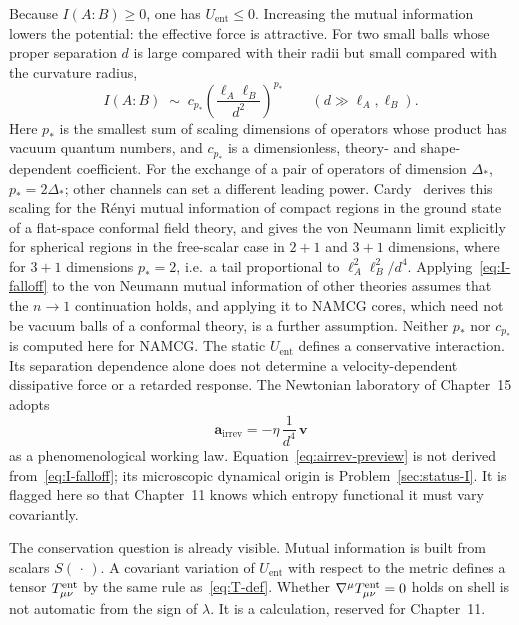 Because \(I(A:B)\ge 0\), one has \(U_{\mathrm{ent}}\le 0\). Increasing
the mutual information lowers the potential: the effective force is
attractive. For two small balls whose proper separation \(d\) is
large compared with their radii but small compared with the curvature
radius,
\begin{equation}
  \label{eq:I-falloff}
  I(A:B)
  \;\sim\;
  c_{p_*}
  \left(\frac{\ell_A\ell_B}{d^2}\right)^{p_*}
  \qquad
  (d\gg \ell_A,\ell_B).
\end{equation}
Here \(p_*\) is the smallest sum of scaling dimensions of operators
whose product has vacuum quantum numbers, and \(c_{p_*}\) is a
dimensionless, theory- and shape-dependent coefficient. For the
exchange of a pair of operators of dimension \(\Delta_*\),
\(p_*=2\Delta_*\); other channels can set a different leading power.
Cardy~\cite{Cardy2013MI} derives this scaling for the R\'enyi mutual
information of compact regions in the ground state of a
flat-space conformal field theory, and gives the von Neumann limit
explicitly for spherical regions in the free-scalar case in
\(2+1\) and \(3+1\) dimensions, where for \(3+1\) dimensions
\(p_*=2\), i.e.\ a tail proportional to \(\ell_A^2\ell_B^2/d^4\).
Applying~\eqref{eq:I-falloff} to the von Neumann mutual information
of other theories assumes that the \(n\to1\) continuation holds, and
applying it to NAMCG cores, which need not be vacuum balls of a
conformal theory, is a further assumption. Neither \(p_*\) nor
\(c_{p_*}\) is computed here for NAMCG. The static \(U_{\mathrm{ent}}\)
defines a conservative interaction. Its separation dependence alone
does not determine a velocity-dependent dissipative force or a
retarded response. The Newtonian laboratory of Chapter~15 adopts
\begin{equation}
  \label{eq:airrev-preview}
  \mathbf{a}_{\mathrm{irrev}}
  =-\eta\,\frac{1}{d^4}\,\mathbf{v}
\end{equation}
as a phenomenological working law. Equation~\eqref{eq:airrev-preview}
is not derived from~\eqref{eq:I-falloff}; its microscopic dynamical
origin is Problem~\ref{sec:status-I}. It is flagged here so that
Chapter~11 knows which entropy functional it must vary covariantly.

The conservation question is already visible. Mutual information is
built from scalars \(S(\,\cdot\,)\). A covariant variation of
\(U_{\mathrm{ent}}\) with respect to the metric defines a tensor
\(T^{\mathrm{ent}}_{\mu\nu}\) by the same rule as~\eqref{eq:T-def}. Whether
\(\nabla^\mu T^{\mathrm{ent}}_{\mu\nu}=0\) holds on shell is not automatic from
the sign of \(\lambda\). It is a calculation, reserved for Chapter~11.

